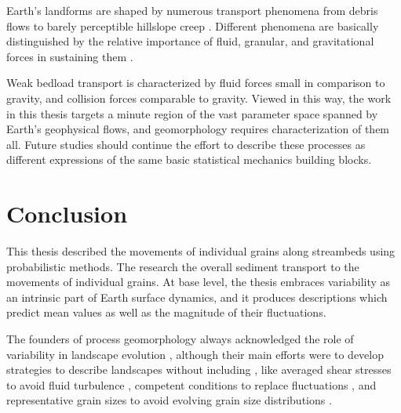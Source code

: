 Earth's landforms are shaped by numerous transport phenomena from \DIFdelbegin {}\DIFdelend \DIFaddbegin {}\DIFaddend debris flows \citep{Iverson1997} to barely perceptible hillslope creep \citep{Deshpande2021}.
Different \DIFaddbegin {}\DIFaddend phenomena are basically distinguished by the relative importance of fluid, granular, and gravitational forces in sustaining them \citep{Jerolmack2019}.

Weak bedload transport is characterized by fluid forces small in comparison to gravity, and collision forces comparable to gravity.
Viewed in this way, the work in this thesis targets a minute region of the vast parameter space spanned by Earth's geophysical flows, and geomorphology requires characterization of them all.
Future studies should continue the effort \DIFdelbegin {}\DIFdelend \DIFaddbegin {}\DIFaddend to describe these processes as different expressions of the same basic statistical mechanics building blocks.

\section{Conclusion}

This thesis \DIFaddbegin {}\DIFaddend described the movements of individual grains along streambeds using probabilistic methods.
The research \DIFdelbegin {}\DIFdelend \DIFaddbegin {}\DIFaddend the overall sediment transport \DIFdelbegin {}\DIFdelend \DIFaddbegin {}\DIFaddend to the movements of individual grains.
At base level, the thesis embraces variability as an intrinsic part of Earth surface dynamics, and it produces descriptions \DIFaddbegin {}\DIFaddend which predict mean values as well as the magnitude of their fluctuations.

The founders of process geomorphology always acknowledged the role of variability in landscape evolution \citep{Horton1945,Strahler1952,Langbein1964}, although their main efforts were to develop strategies to describe landscapes without including \DIFdelbegin {}\DIFdelend \DIFaddbegin {}\DIFaddend , like averaged shear stresses to avoid fluid turbulence \citep{MeyerPeter1948,Bagnold1954}, competent conditions to replace \DIFdelbegin {}\DIFdelend \DIFaddbegin {}\DIFaddend fluctuations \citep{Wolman1959,Wolman1978}, and representative grain sizes to avoid evolving \DIFaddbegin {}\DIFaddend grain size distributions \citep{Parker1982,Andrews1983}.

